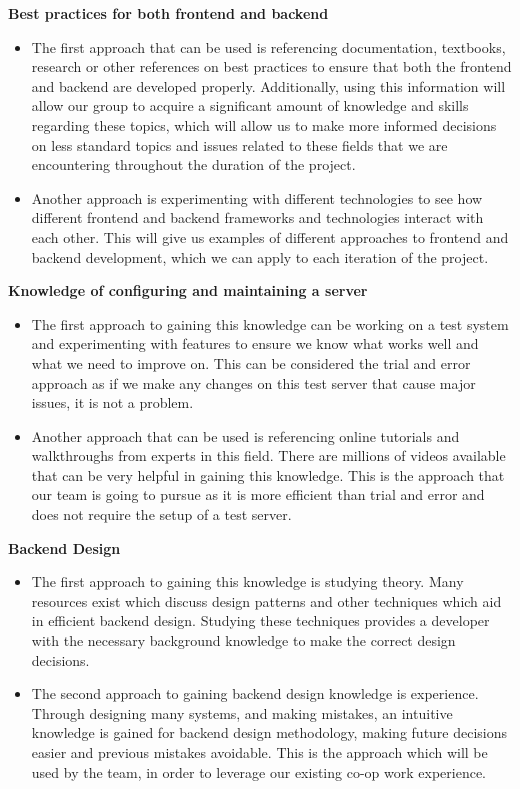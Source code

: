 \documentclass[12pt]{article}
\begin{document}
\begin{enumerate}
\begin{itemize}
\end{itemize}
\textbf{Best practices for both frontend and backend}
\begin{itemize}
    \item The first approach that can be used is referencing documentation, textbooks, research or other references on best practices to ensure that both the frontend and backend are developed properly. Additionally, using this information will allow our group to acquire a significant amount of knowledge and skills regarding these topics, which will allow us to make more informed decisions on less standard topics and issues related to these fields that we are encountering throughout the duration of the project.
    \item Another approach is experimenting with different technologies to see how different frontend and backend frameworks and technologies interact with each other. This will give us examples of different approaches to frontend and backend development, which we can apply to each iteration of the project.
\end{itemize}
\textbf{Knowledge of configuring and maintaining a server}
\begin{itemize}
\item The first approach to gaining this knowledge can be working on a test system and experimenting with features to ensure we know what works well and what we need to improve on. This can be considered the trial and error approach as if we make any changes on this test server that cause major issues, it is not a problem.
\item Another approach that can be used is referencing online tutorials and walkthroughs from experts in this field. There are millions of videos available that can be very helpful in gaining this knowledge. This is the approach that our team is going to pursue as it is more efficient than trial and error and does not require the setup of a test server. 
\end{itemize}
\textbf{Backend Design}
\begin{itemize}
\item The first approach to gaining this knowledge is studying theory. Many resources exist which discuss design patterns and other techniques which aid in efficient backend design. Studying these techniques provides a developer with the necessary background knowledge to make the correct design decisions.
\item The second approach to gaining backend design knowledge is experience. Through designing many systems, and making mistakes, an intuitive knowledge is gained for backend design methodology, making future decisions easier and previous mistakes avoidable. This is the approach which will be used by the team, in order to leverage our existing co-op work experience.
\end{itemize}

\end{enumerate}
\end{document}
